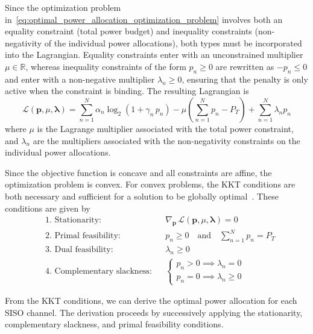 Since the optimization problem in~\eqref{eq:optimal_power_allocation_optimization_problem} involves both an equality constraint (total power budget) and inequality constraints (non-negativity of the individual power allocations), both types must be incorporated into the Lagrangian.
Equality constraints enter with an unconstrained multiplier $\mu \in \mathbb{R}$, whereas inequality constraints of the form $p_n \geq 0$ are rewritten as $-p_n \leq 0$ and enter with a non-negative multiplier $\lambda_n \geq 0$, ensuring that the penalty is only active when the constraint is binding.
The resulting Lagrangian is
\begin{equation}
    \mathcal{L}(\mathbf{p}, \mu, \boldsymbol{\lambda}) = \sum_{n=1}^{N} \alpha_n \log_2 \left( 1 + \gamma_n \, p_n \right) - \mu \left(\sum_{n=1}^{N} p_n - P_T \right) + \sum_{n=1}^{N} \lambda_n p_n
\end{equation}
where $\mu$ is the Lagrange multiplier associated with the total power constraint, and $\lambda_n$ are the multipliers associated with the non-negativity constraints on the individual power allocations.

Since the objective function is concave and all constraints are affine, the optimization problem is convex.
For convex problems, the \acf{KKT} conditions are both necessary and sufficient for a solution to be globally optimal~\cite{convex_optimization_2004, KKT_conditions_2009}.
These conditions are given by
\begin{subequations}
\label{eq:KKT_conditions}
\begin{align}
    & \text{1. Stationarity:}               && \nabla_{\mathbf{p}} \, \mathcal{L}(\mathbf{p}, \mu, \boldsymbol{\lambda}) = 0 \\
    & \text{2. Primal feasibility:}         && p_n \geq 0  \quad \text{and} \quad \sum_{n=1}^{N} p_n = P_T \\
    & \text{3. Dual feasibility:}           && \lambda_n \geq 0 \\
    & \text{4. Complementary slackness:}    && \begin{cases} p_n > 0 \implies \lambda_n = 0 \\ p_n = 0 \implies \lambda_n \geq 0 \end{cases}
\end{align}
\end{subequations}

From the \ac{KKT} conditions, we can derive the optimal power allocation for each \ac{SISO} channel. The derivation proceeds by successively applying the stationarity, complementary slackness, and primal feasibility conditions.

